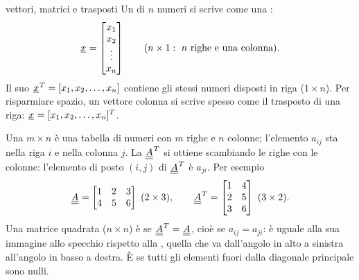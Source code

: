 \begin{richiamo}{vettori, matrici e trasposti}
Un  di $n$ numeri si scrive come una :
\[ {\mkern1mu\underline{x}\mkern1mu} = \begin{bmatrix} x_1 \\ x_2 \\ \vdots \\ x_n \end{bmatrix} \qquad (n \times 1:\ n \text{ righe e una
   colonna}) . \]
Il suo  ${\mkern1mu\underline{x}\mkern1mu}^T = [x_1, x_2, \ldots, x_n]$ contiene gli stessi numeri disposti in riga
($1 \times n$). Per risparmiare spazio, un vettore colonna si scrive spesso come il trasposto di una riga:
${\mkern1mu\underline{x}\mkern1mu} = [x_1, x_2, \ldots, x_n]^T$.

Una  $m \times n$ è una tabella di numeri con $m$ righe e $n$ colonne; l'elemento $a_{ij}$ sta nella riga
$i$ e nella colonna $j$. La  ${\mkern1mu\underline{\underline{A}}\mkern1mu}^T$ si ottiene scambiando le righe con le colonne: l'elemento di
posto $(i, j)$ di ${\mkern1mu\underline{\underline{A}}\mkern1mu}^T$ è $a_{ji}$. Per esempio
\[ {\mkern1mu\underline{\underline{A}}\mkern1mu} = \begin{bmatrix} 1 & 2 & 3 \\ 4 & 5 & 6 \end{bmatrix} \ (2 \times 3) , \qquad
   {\mkern1mu\underline{\underline{A}}\mkern1mu}^T = \begin{bmatrix} 1 & 4 \\ 2 & 5 \\ 3 & 6 \end{bmatrix} \ (3 \times 2) . \]
Una matrice quadrata ($n \times n$) è  se ${\mkern1mu\underline{\underline{A}}\mkern1mu}^T = {\mkern1mu\underline{\underline{A}}\mkern1mu}$, cioè se $a_{ij} = a_{ji}$: è uguale
alla sua immagine allo specchio rispetto alla , quella che va dall'angolo in alto a sinistra
all'angolo in basso a destra. È  se tutti gli elementi fuori dalla diagonale principale sono nulli.
\end{richiamo}

